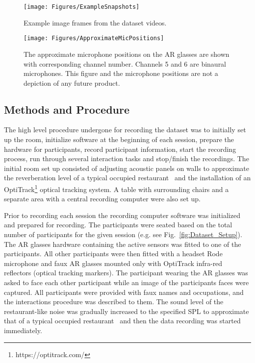 \documentclass[journal]{IEEEtran}
\begin{document}
\begin{figure*}
    \centering
    \texttt{[image: Figures/ExampleSnapshots]}
    \caption{Example image frames from the dataset videos.}
    \label{fig:Example_Snapshot}
\end{figure*}

\begin{figure}
\centering
\texttt{[image: Figures/ApproximateMicPositions]}
\caption{The approximate microphone positions on the AR glasses are shown with corresponding channel number. Channels 5 and 6 are binaural microphones. This figure and the microphone positions are not a depiction of any future product.}
\label{fig:glasses_mic_positions}
\end{figure}

\subsection{Methods and Procedure}
The high level procedure undergone for recording the dataset was to initially set up the room, initialize software at the beginning of each session, prepare the hardware for participants, record participant information, start the recording process, run through several interaction tasks and stop/finish the recordings.
The initial room set up consisted of adjusting acoustic panels on walls to approximate the reverberation level of a typical occupied restaurant~\cite{rindel2012acoustical,rindel2019restaurant} and the installation of an OptiTrack\footnote{https://optitrack.com/} optical tracking system.
A table with surrounding chairs and a separate area with a central recording computer were also set up.


Prior to recording each session the recording computer software was initialized and prepared for recording.
The participants were seated based on the total number of participants for the given session (e.g. see Fig.~\ref{fig:Dataset_Setup}).
The AR glasses hardware containing the active sensors was fitted to one of the participants.
All other participants were then fitted with a headset Rode microphone and faux AR glasses mounted only with OptiTrack infra-red reflectors (optical tracking markers).
The participant wearing the AR glasses was asked to face each other participant while an image of the participants faces were captured.
All participants were provided with faux names and occupations, and the interactions procedure was described to them.
The sound level of the restaurant-like noise was gradually increased to the specified SPL to approximate that of a typical occupied restaurant~\cite{rindel2019restaurant} and then the data recording was started immediately.
\end{document}

